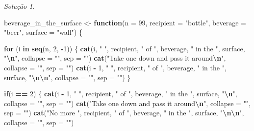 \documentclass[
]{latex/krantz}
\newenvironment{Shaded}{\begin{snugshade}}{\end{snugshade}}
\newcommand{\AttributeTok}[1]{\textcolor[rgb]{0.13,0.29,0.53}{#1}}
\newcommand{\ControlFlowTok}[1]{\textcolor[rgb]{0.13,0.29,0.53}{\textbf{#1}}}
\newcommand{\DecValTok}[1]{\textcolor[rgb]{0.00,0.00,0.81}{#1}}
\newcommand{\FunctionTok}[1]{\textcolor[rgb]{0.13,0.29,0.53}{\textbf{#1}}}
\newcommand{\NormalTok}[1]{#1}
\newcommand{\OtherTok}[1]{\textcolor[rgb]{0.56,0.35,0.01}{#1}}
\newcommand{\SpecialCharTok}[1]{\textcolor[rgb]{0.81,0.36,0.00}{\textbf{#1}}}
\newcommand{\StringTok}[1]{\textcolor[rgb]{0.31,0.60,0.02}{#1}}
\theoremstyle{definition}
\theoremstyle{definition}
\theoremstyle{definition}
\theoremstyle{definition}
\theoremstyle{remark}
\newtheorem*{solution}{Solução}
\begin{document}
\begin{solution}
\begin{Shaded}
\begin{Highlighting}[]
\NormalTok{beverage\_in\_the\_surface }\OtherTok{\textless{}{-}} \ControlFlowTok{function}\NormalTok{(}\AttributeTok{n =} \DecValTok{99}\NormalTok{, }\AttributeTok{recipient =} \StringTok{"bottle"}\NormalTok{, }\AttributeTok{beverage =} \StringTok{"beer"}\NormalTok{, }\AttributeTok{surface =} \StringTok{"wall"}\NormalTok{) \{}

  \ControlFlowTok{for}\NormalTok{ (i }\ControlFlowTok{in} \FunctionTok{seq}\NormalTok{(n, }\DecValTok{2}\NormalTok{, }\SpecialCharTok{{-}}\DecValTok{1}\NormalTok{)) \{}
    \FunctionTok{cat}\NormalTok{(i, }\StringTok{" "}\NormalTok{, recipient, }\StringTok{" of "}\NormalTok{, beverage, }\StringTok{" in the "}\NormalTok{, surface, }\StringTok{"}\SpecialCharTok{\textbackslash{}n}\StringTok{"}\NormalTok{, }\AttributeTok{collapse =} \StringTok{""}\NormalTok{, }\AttributeTok{sep =} \StringTok{""}\NormalTok{)}
    \FunctionTok{cat}\NormalTok{(}\StringTok{"Take one down and pass it around}\SpecialCharTok{\textbackslash{}n}\StringTok{"}\NormalTok{, }\AttributeTok{collapse =} \StringTok{""}\NormalTok{, }\AttributeTok{sep =} \StringTok{""}\NormalTok{)}
    \FunctionTok{cat}\NormalTok{(i }\SpecialCharTok{{-}} \DecValTok{1}\NormalTok{, }\StringTok{" "}\NormalTok{, recipient, }\StringTok{" of "}\NormalTok{, beverage, }\StringTok{" in the "}\NormalTok{, surface, }\StringTok{"}\SpecialCharTok{\textbackslash{}n\textbackslash{}n}\StringTok{"}\NormalTok{, }\AttributeTok{collapse =} \StringTok{""}\NormalTok{, }\AttributeTok{sep =} \StringTok{""}\NormalTok{)}
\NormalTok{  \}}
  
  \ControlFlowTok{if}\NormalTok{(i }\SpecialCharTok{==} \DecValTok{2}\NormalTok{) \{}
    \FunctionTok{cat}\NormalTok{(i }\SpecialCharTok{{-}} \DecValTok{1}\NormalTok{, }\StringTok{" "}\NormalTok{, recipient, }\StringTok{" of "}\NormalTok{, beverage, }\StringTok{" in the "}\NormalTok{, surface, }\StringTok{"}\SpecialCharTok{\textbackslash{}n}\StringTok{"}\NormalTok{, }\AttributeTok{collapse =} \StringTok{""}\NormalTok{, }\AttributeTok{sep =} \StringTok{""}\NormalTok{)}
    \FunctionTok{cat}\NormalTok{(}\StringTok{"Take one down and pass it around}\SpecialCharTok{\textbackslash{}n}\StringTok{"}\NormalTok{, }\AttributeTok{collapse =} \StringTok{""}\NormalTok{, }\AttributeTok{sep =} \StringTok{""}\NormalTok{)}
    \FunctionTok{cat}\NormalTok{(}\StringTok{"No more "}\NormalTok{, recipient, }\StringTok{" of "}\NormalTok{, beverage, }\StringTok{" in the "}\NormalTok{, surface, }\StringTok{"}\SpecialCharTok{\textbackslash{}n\textbackslash{}n}\StringTok{"}\NormalTok{, }\AttributeTok{collapse =} \StringTok{""}\NormalTok{, }\AttributeTok{sep =} \StringTok{""}\NormalTok{)}
    

\end{Highlighting}
\end{Shaded}
\end{solution}
\end{document}
